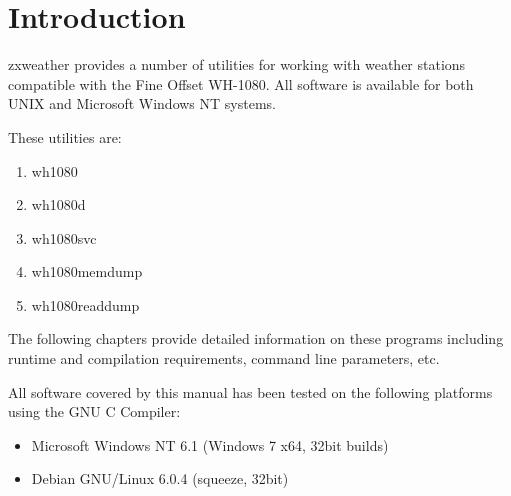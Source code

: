 \documentclass[a4paper,10pt,draft]{book}
\newcommand{\partnumber}{\ifthenelse{\isundefined{\projectnum}}{}{\projectnum-\docnum	\ifthenelse{\equal{\docrev}{001}}{}{.\docrev}}}
\begin{document}

\ifthenelse{\isundefined{\ordernumber}}{

\title{\doctitle{} - \docsubtitle}
\author{\docauthor}
}{

\title{\doctitle}
\subtitle{\docsubtitle}
\titleabstract{\docabstract}
\ordernumber{\partnumber}
\updateinfo{\docupdateinfo}
\osinfo{\docosver}
\swversion{\docswver}
\titlecopyright{\doccopyright}
\licensestatement{\doclicense}
}
\date{\docdate}

\maketitle

\clearpage

\tableofcontents
\clearpage


\chapter{Introduction}
\setcounter{page}{1}

zxweather provides a number of utilities for working with weather stations compatible with the Fine Offset WH-1080. All software is available for both UNIX and Microsoft Windows NT systems.

These utilities are:
\begin{enumerate}
\item wh1080
\item wh1080d
\item wh1080svc
\item wh1080memdump
\item wh1080readdump
\end{enumerate}

The following chapters provide detailed information on these programs including runtime and compilation requirements, command line parameters, etc.

All software covered by this manual has been tested on the following platforms using the GNU C Compiler:
\begin{itemize}
\item Microsoft Windows NT 6.1 (Windows 7 x64, 32bit builds)
\item Debian GNU/Linux 6.0.4 (squeeze, 32bit)
\end{itemize}
\end{document}
